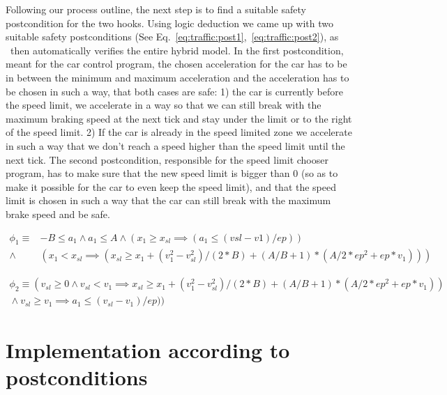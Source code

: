 Following our process outline, the next step is to find a suitable safety postcondition for the two hooks. Using logic deduction we came up with two suitable safety postconditions (See Eq.~\ref{eq:traffic:post1},~\ref{eq:traffic:post2}), as \keym~then automatically verifies the entire hybrid model. In the first postcondition, meant for the car control program, the chosen acceleration for the car has to be in between the minimum and maximum acceleration and the acceleration has to be chosen in such a way, that both cases are safe: 1) the car is currently before the speed limit, we accelerate in a way so that we can still break with the maximum braking speed at the next tick and stay under the limit or to the right of the speed limit. 2) If the car is already in the speed limited zone we accelerate in such a way that we don't reach a speed higher than the speed limit until the next tick. The second postcondition, responsible for the speed limit chooser program, has to make sure that the new speed limit is bigger than 0 (so as to make it possible for the car to even keep the speed limit), and that the speed limit is chosen in such a way that the car can still break with the maximum brake speed and be safe.

\begin{equation}
\begin{split}
	\phi_1 \equiv&-B \leq a_1 \wedge a_1 \leq A \wedge (x_1 \geq x_{sl} \implies (a_1 \leq (vsl - v1) / ep)) \\
	 {}\wedge{}& (x_1 < x_{sl} \implies (x_{sl} \geq x_1 + (v_1^2 - v_{sl}^2) / (2 * B) + (A / B + 1) * (A / 2 * ep^2 + ep * v_1)))
	\end{split}
	\label{eq:traffic:post1}
\end{equation}
	
	
\begin{equation}
\begin{split}
	\phi_2\equiv (v_{sl} \geq 0 \wedge v_{sl} < v_1 \implies{}   x_{sl} \geq x_1 + (v_1^{2} - v_{sl} ^{2}) / (2*B) + (A/B + 1) *  (A / 2 * ep^2 + ep * v_1)) \\
	{}\wedge  v_{sl} \geq v_1 \implies a_1 \leq (v_{sl} - v_1) / ep))
\end{split}
	\label{eq:traffic:post2}
\end{equation}

\section{Implementation according to postconditions}
\label{sec:traffic:impl}

